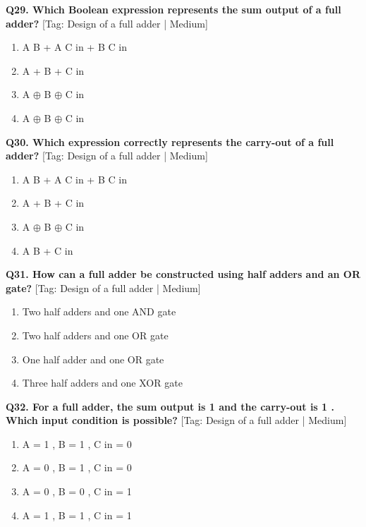 \noindent\textbf{Q29. Which Boolean expression represents the sum output of a full adder?} \hfill [Tag: Design of a full adder | Medium]
\begin{enumerate}[label=(\alph*),topsep=2pt,itemsep=1pt,partopsep=0pt,parsep=0pt]
    \item {A B + A C in + B C in}
    \item {A + B + C in}
    \item {A $\oplus$ B $\oplus$ C in}
    \item {A $\oplus$ B $\oplus$ C in}
\end{enumerate}
\vspace{2mm}

\noindent\textbf{Q30. Which expression correctly represents the carry-out of a full adder?} \hfill [Tag: Design of a full adder | Medium]
\begin{enumerate}[label=(\alph*),topsep=2pt,itemsep=1pt,partopsep=0pt,parsep=0pt]
    \item {A B + A C in + B C in}
    \item {A + B + C in}
    \item {A $\oplus$ B $\oplus$ C in}
    \item {A B + C in}
\end{enumerate}
\vspace{2mm}

\noindent\textbf{Q31. How can a full adder be constructed using half adders and an OR gate?} \hfill [Tag: Design of a full adder | Medium]
\begin{enumerate}[label=(\alph*),topsep=2pt,itemsep=1pt,partopsep=0pt,parsep=0pt]
    \item {Two half adders and one AND gate}
    \item {Two half adders and one OR gate}
    \item {One half adder and one OR gate}
    \item {Three half adders and one XOR gate}
\end{enumerate}
\vspace{2mm}

\noindent\textbf{Q32. For a full adder, the sum output is 1 and the carry-out is 1 . Which input condition is possible?} \hfill [Tag: Design of a full adder | Medium]
\begin{enumerate}[label=(\alph*),topsep=2pt,itemsep=1pt,partopsep=0pt,parsep=0pt]
    \item {A = 1 , B = 1 , C in = 0}
    \item {A = 0 , B = 1 , C in = 0}
    \item {A = 0 , B = 0 , C in = 1}
    \item {A = 1 , B = 1 , C in = 1}
\end{enumerate}
\vspace{2mm}

